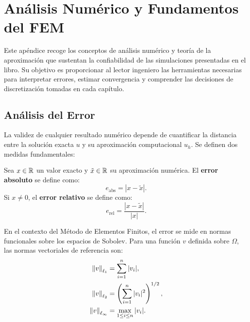 \chapter{Análisis Numérico y Fundamentos del FEM}
\label{app:calculo}

Este apéndice recoge los conceptos de análisis numérico y teoría de la aproximación que sustentan la confiabilidad de las simulaciones presentadas en el libro. Su objetivo es proporcionar al lector ingeniero las herramientas necesarias para interpretar errores, estimar convergencia y comprender las decisiones de discretización tomadas en cada capítulo.

\section{Análisis del Error}

La validez de cualquier resultado numérico depende de cuantificar la distancia entre la solución exacta $u$ y su aproximación computacional $u_h$. Se definen dos medidas fundamentales:

\begin{definicion}
    Sea $x \in \mathbb{R}$ un valor exacto y $\tilde{x} \in \mathbb{R}$ su aproximación numérica. El \textbf{error absoluto} se define como:
    \begin{equation}
        e_{\text{abs}} = |x - \tilde{x}|.
    \end{equation}
    Si $x \neq 0$, el \textbf{error relativo} se define como:
    \begin{equation}
        e_{\text{rel}} = \frac{|x - \tilde{x}|}{|x|}.
    \end{equation}
\end{definicion}

En el contexto del Método de Elementos Finitos, el error se mide en normas funcionales sobre los espacios de Sobolev. Para una función $v$ definida sobre $\Omega$, las normas vectoriales de referencia son:
\begin{align}
    \left\lVert v\right\rVert_{\ell_1} &= \sum_{i=1}^{n} |v_i|, \\
    \left\lVert v\right\rVert_{\ell_2} &= \left( \sum_{i=1}^{n} |v_i|^2 \right)^{1/2}, \\
    \left\lVert v\right\rVert_{\ell_\infty} &= \max_{1 \leq i \leq n} |v_i|.
\end{align}

